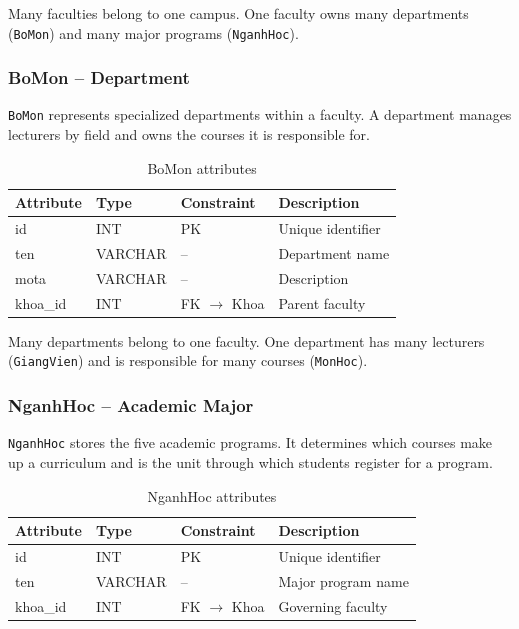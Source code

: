 \documentclass[12pt,a4paper]{report}
\begin{document}
Many faculties belong to one campus. One faculty owns many departments (\texttt{BoMon}) and many major programs (\texttt{NganhHoc}).

\subsubsection{BoMon -- Department}

\texttt{BoMon} represents specialized departments within a faculty. A department manages lecturers by field and owns the courses it is responsible for.

\begin{table}[H]
\renewcommand{\arraystretch}{1.35}
\caption{BoMon attributes}
\label{tab:bomon}
\begin{tabular}{|p{3cm}|p{2.5cm}|p{2.5cm}|p{5.5cm}|}
  \hline
  \textbf{Attribute} & \textbf{Type} & \textbf{Constraint} & \textbf{Description} \\
  \hline
  id & INT & PK & Unique identifier \\
  \hline
  ten & VARCHAR & -- & Department name \\
  \hline
  mota & VARCHAR & -- & Description \\
  \hline
  khoa\_id & INT & FK $\to$ Khoa & Parent faculty \\
  \hline
\end{tabular}
\end{table}

Many departments belong to one faculty. One department has many lecturers (\texttt{GiangVien}) and is responsible for many courses (\texttt{MonHoc}).

\subsubsection{NganhHoc -- Academic Major}

\texttt{NganhHoc} stores the five academic programs. It determines which courses make up a curriculum and is the unit through which students register for a program.

\begin{table}[H]
\renewcommand{\arraystretch}{1.35}
\caption{NganhHoc attributes}
\label{tab:nganhhoc}
\begin{tabular}{|p{3cm}|p{2.5cm}|p{2.5cm}|p{5.5cm}|}
  \hline
  \textbf{Attribute} & \textbf{Type} & \textbf{Constraint} & \textbf{Description} \\
  \hline
  id & INT & PK & Unique identifier \\
  \hline
  ten & VARCHAR & -- & Major program name \\
  \hline
  khoa\_id & INT & FK $\to$ Khoa & Governing faculty \\
  \hline
\end{tabular}
\end{table}
\end{document}
